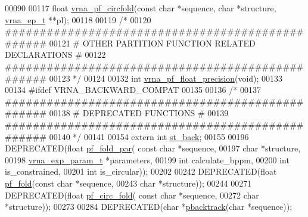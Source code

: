 \begin{DoxyCode}
00090 
00117 \textcolor{keywordtype}{float} \hyperlink{group__pf__fold_ga87e5a77b6e50dd54e9d032a9b92973be}{vrna\_pf\_circfold}(\textcolor{keyword}{const} \textcolor{keywordtype}{char} *sequence, \textcolor{keywordtype}{char} *structure, 
      \hyperlink{group__struct__utils_structvrna__elem__prob__s}{vrna\_ep\_t} **pl);
00118 
00119 \textcolor{comment}{/*}
00120 \textcolor{comment}{#################################################}
00121 \textcolor{comment}{# OTHER PARTITION FUNCTION RELATED DECLARATIONS #}
00122 \textcolor{comment}{#################################################}
00123 \textcolor{comment}{*/}
00124 
00132 \textcolor{keywordtype}{int} \hyperlink{part__func_8h_ad2b3594f0b50b68029e0f54fdce59313}{vrna\_pf\_float\_precision}(\textcolor{keywordtype}{void});
00133 
00134 \textcolor{preprocessor}{#ifdef  VRNA\_BACKWARD\_COMPAT}
00135 
00136 \textcolor{comment}{/*}
00137 \textcolor{comment}{#################################################}
00138 \textcolor{comment}{# DEPRECATED FUNCTIONS                          #}
00139 \textcolor{comment}{#################################################}
00140 \textcolor{comment}{*/}
00141 
00154 \textcolor{keyword}{extern}  \textcolor{keywordtype}{int} \hyperlink{group__subopt__stochbt_gacd79b1a570e6ad9be24cb11fe8cae30a}{st\_back};
00155 
00196 DEPRECATED(\textcolor{keywordtype}{float}   \hyperlink{group__pf__fold_gac4f95bee734b2563a3d6e9932117ebdf}{pf\_fold\_par}(  \textcolor{keyword}{const} \textcolor{keywordtype}{char} *sequence,
00197                       \textcolor{keywordtype}{char} *structure,
00198                       \hyperlink{group__energy__parameters_structvrna__exp__param__s}{vrna\_exp\_param\_t} *parameters,
00199                       \textcolor{keywordtype}{int} calculate\_bppm,
00200                       \textcolor{keywordtype}{int} is\_constrained,
00201                       \textcolor{keywordtype}{int} is\_circular));
00202 
00242 DEPRECATED(\textcolor{keywordtype}{float}   \hyperlink{group__pf__fold_gadc3db3d98742427e7001a7fd36ef28c2}{pf\_fold}(\textcolor{keyword}{const} \textcolor{keywordtype}{char} *sequence,
00243                 \textcolor{keywordtype}{char} *structure));
00244 
00271 DEPRECATED(\textcolor{keywordtype}{float}   \hyperlink{group__pf__fold_ga819ce5fca8984004ac81c4a3b04cb735}{pf\_circ\_fold}( \textcolor{keyword}{const} \textcolor{keywordtype}{char} *sequence,
00272                       \textcolor{keywordtype}{char} *structure));
00273 
00284 DEPRECATED(\textcolor{keywordtype}{char}    *\hyperlink{group__subopt__stochbt_gac03ca6db186bb3bf0a2a326d7fb3ba03}{pbacktrack}(\textcolor{keywordtype}{char} *sequence));

\end{DoxyCode}
